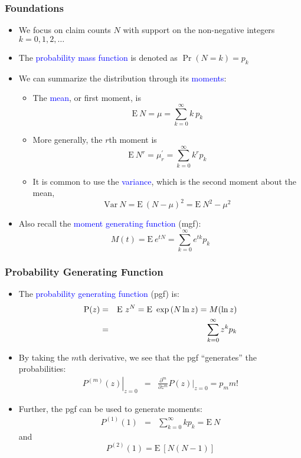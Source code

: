 \documentclass{beamer}
\begin{document}
\begin{frame}%
 \frametitle{Foundations}
\begin{itemize}
\item We focus on claim counts $ N$ with support on the non-negative integers $k=0,1,2,
\ldots$ %
 \item The \textcolor{blue}{probability mass function} is denoted as $\Pr(N = k) =
 p_k$ \vspace{2mm}
 \item We can summarize the distribution through its
 \textcolor{blue}{moments}:
\begin{itemize}
\item The \textcolor{blue}{mean}, or first moment, is
$$ \mathrm{E~} N = \mu = \sum^{\infty}_{k=0} k ~ p_k $$
\item More generally, the $r$th moment is
$$ \mathrm{E~} N^r = \mu^{\prime}_r = \sum^{\infty}_{k=0} k^r p_k $$
\item It is common to use the \textcolor{blue}{variance}, which is the second moment about the mean,
$$\mathrm{Var~} N = \mathrm{E~} (N-\mu)^2 = \mathrm{E~} N^2 -
\mu^2$$ %
 \end{itemize}
\item Also recall the \textcolor{blue}{moment generating function} (mgf):
$$M(t) = \mathrm{E~}e^{tN} = \sum^{\infty}_{k=0} e^{tk} p_k $$
\end{itemize}
\end{frame}

\begin{frame}%
 \frametitle{Probability Generating Function}
\begin{itemize}
 \item The \textcolor{blue}{probability generating function} (pgf) is:
\begin{eqnarray*}
\mathrm{P}(z) &=& \mathrm{E~}z^N = \mathrm{E~}\exp{(N \ln z)} = M(\ln{z})\\
&=& \sum^{\infty}_{k=0} z^k p_k \vspace{2mm}
\end{eqnarray*}
\item By taking the $m$th derivative, we see that the pgf ``generates'' the
probabilities:
\begin{eqnarray*}
\left. P^{(m)}(z)\right|_{z=0} &=& \frac{\partial^m }{\partial z^m} P(z)|_{z=0} = p_m m!
\end{eqnarray*}
 \vspace{2mm}
\item Further, the pgf can be used to generate moments:
\begin{eqnarray*}
P^{(1)}(1) &=& \sum^{\infty}_{k=0} k p_k = \mathrm{E~}N
\end{eqnarray*}
and
\begin{equation*}
P^{(2)}(1) = \mathrm{E~}[N(N-1)]
\end{equation*}
 \end{itemize}
\end{frame}
\end{document}
